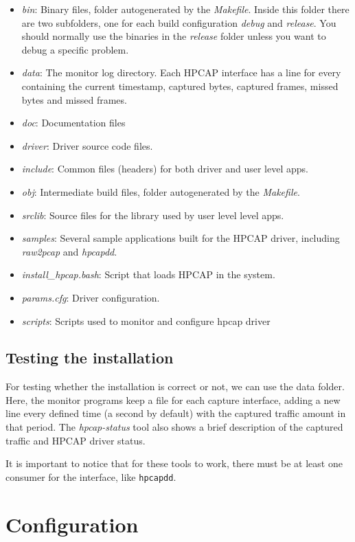 \documentclass[a4paper,oneside]{hpman}
\begin{document}
\begin{itemize}
\item \textit{bin}: Binary files, folder autogenerated by the \textit{Makefile}. Inside this folder there are two subfolders, one for each build configuration \textit{debug} and \textit{release}. You should normally use the binaries in the \textit{release} folder unless you want to debug a specific problem.
\item \textit{data}: The monitor log directory. Each HPCAP interface has a line for every containing the current timestamp, captured bytes, captured frames, missed bytes and missed frames.
\item \textit{doc}: Documentation files
\item \textit{driver}: Driver source code files.
\item \textit{include}: Common files (headers) for both driver and user level apps.
\item \textit{obj}: Intermediate build files, folder autogenerated by the \textit{Makefile}.
\item \textit{srclib}: Source files for the library used by user level level apps.
\item \textit{samples}: Several sample applications built for the HPCAP driver, including \textit{raw2pcap} and \textit{hpcapdd}.
\item \textit{install\_hpcap.bash}: Script that loads HPCAP in the system.
\item \textit{params.cfg}: Driver configuration.
\item \textit{scripts}: Scripts used to monitor and configure hpcap driver
\end{itemize}

\section{Testing the installation}

For testing whether the installation is correct or not, we can use the data folder. Here, the monitor programs keep a file for each capture interface, adding a new line every defined time (a second by default) with the captured traffic amount in that period. The \textit{hpcap-status} tool also shows a brief description of the captured traffic and HPCAP driver status.

It is important to notice that for these tools to work, there must be at least one consumer for the interface, like \texttt{hpcapdd}.

\chapter{Configuration}
\label{sec:Configuration}
\end{document}
